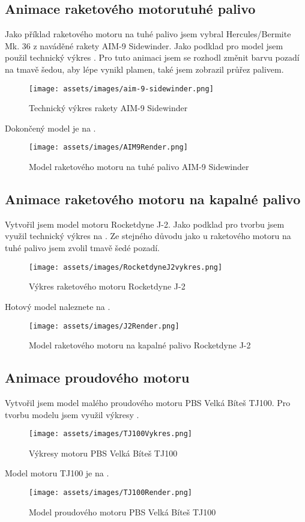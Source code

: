 \subsection{Animace raketového motorutuhé palivo}
{Jako příklad raketového motoru na tuhé palivo jsem vybral Hercules/Bermite Mk. 36 z naváděné rakety AIM-9 Sidewinder. Jako podklad pro model jsem použil technický výkres . Pro tuto animaci jsem se rozhodl změnit barvu pozadí na tmavě šedou, aby lépe vynikl plamen, také jsem zobrazil průřez palivem.}
\begin{figure}[H]
    \centering
    \texttt{[image: assets/images/aim-9-sidewinder.png]}
    \caption{Technický výkres rakety AIM-9 Sidewinder \cite{TB:AIM9Sidewinder}}
    \label{obr:AIM9vykres}
\end{figure}
{Dokončený model je na .}
\begin{figure}[H]
    \centering
    \texttt{[image: assets/images/AIM9Render.png]}
    \caption{Model raketového motoru na tuhé palivo AIM-9 Sidewinder \jaObr}
    \label{obr:AIM9Render}
\end{figure}
\newpage
\subsection{Animace raketového motoru na kapalné palivo}
{Vytvořil jsem model motoru Rocketdyne J-2. Jako podklad pro tvorbu jsem využil technický výkres na . Ze stejného důvodu jako u raketového motoru na tuhé palivo jsem zvolil tmavě šedé pozadí.}
\begin{figure}[H]
    \centering
    \texttt{[image: assets/images/RocketdyneJ2vykres.png]}
    \caption{Výkres raketového motoru Rocketdyne J-2 \cite[přeloženo]{HR:F1RocketEngine}}
    \label{obr:J2vykres}
\end{figure}
{Hotový model naleznete na .}
\begin{figure}[H]
    \centering
    \texttt{[image: assets/images/J2Render.png]}
    \caption{Model raketového motoru na kapalné palivo Rocketdyne J-2 \jaObr}
    \label{obr:J2Render}
\end{figure}
\newpage
\subsection{Animace proudového motoru}
{Vytvořil jsem model malého proudového motoru PBS Velká Bíteš TJ100. Pro tvorbu modelu jsem využil výkresy .}
\begin{figure}[H]
    \centering
    \texttt{[image: assets/images/TJ100Vykres.png]}
    \caption{Výkresy motoru PBS Velká Bíteš TJ100 \cite[přeloženo]{PBS:Minijets}}
    \label{obr:PBSTJ100Vykres}
\end{figure}
{Model motoru TJ100 je na .}
\begin{figure}[H]
    \centering
    \texttt{[image: assets/images/TJ100Render.png]}
    \caption{Model proudového motoru PBS Velká Bíteš TJ100 \jaObr}
    \label{obr:TJ100Render}
\end{figure}
\newpage
